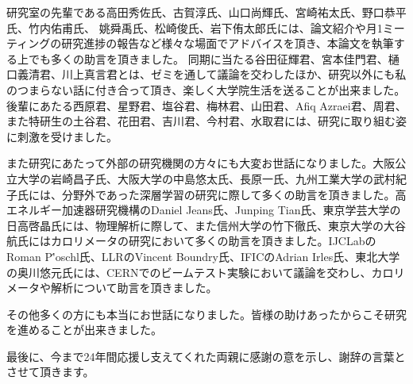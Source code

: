 研究室の先輩である高田秀佐氏、古賀淳氏、山口尚輝氏、宮崎祐太氏、野口恭平氏、竹内佑甫氏、 姚舜禹氏、松崎俊氏、岩下侑太郎氏には、論文紹介や月1ミーティングの研究進捗の報告など様々な場面でアドバイスを頂き、本論文を執筆する上でも多くの助言を頂きました。
同期に当たる谷田征輝君、宮本佳門君、樋口義清君、川上真言君とは、ゼミを通して議論を交わしたほか、研究以外にも私のつまらない話に付き合って頂き、楽しく大学院生活を送ることが出来ました。
後輩にあたる西原君、星野君、塩谷君、梅林君、山田君、Afiq Azraei君、周君、また特研生の土谷君、花田君、吉川君、今村君、水取君には、研究に取り組む姿に刺激を受けました。

また研究にあたって外部の研究機関の方々にも大変お世話になりました。大阪公立大学の岩崎昌子氏、大阪大学の中島悠太氏、長原一氏、九州工業大学の武村紀子氏には、分野外であった深層学習の研究に際して多くの助言を頂きました。高エネルギー加速器研究機構のDaniel Jeans氏、Junping Tian氏、東京学芸大学の日高啓晶氏には、物理解析に際して、また信州大学の竹下徹氏、東京大学の大谷航氏にはカロリメータの研究において多くの助言を頂きました。IJCLabのRoman P\''oschl氏、LLRのVincent Boundry氏、IFICのAdrian Irles氏、東北大学の奥川悠元氏には、CERNでのビームテスト実験において議論を交わし、カロリメータや解析について助言を頂きました。

その他多くの方にも本当にお世話になりました。皆様の助けあったからこそ研究を進めることが出来きました。

最後に、今まで24年間応援し支えてくれた両親に感謝の意を示し、謝辞の言葉とさせて頂きます。